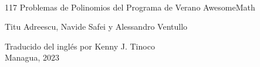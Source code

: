\begin{titlepage}
    \begin{center}
        \ \\ \vspace{6cm}
        {\LARGE 117 Problemas de Polinomios del Programa de Verano AwesomeMath}

        \vspace{2cm}
        {\Large Titu Adreescu, Navide Safei y Alessandro Ventullo}

        \vfill
        {\large Traducido del inglés por Kenny J. Tinoco}\\
        \vspace{0.35cm}
        {\large Managua, 2023}

    \end{center}
\end{titlepage}